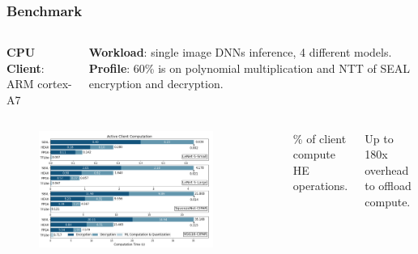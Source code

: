 \documentclass[10pt,handout]{beamer}
\begin{document}
\begin{frame}
\frametitle{Benchmark}
\begin{columns}
    \textbf{CPU Client}: ARM cortex-A7
    \vspace{0.1cm}

    \textbf{Workload}: single image DNNs inference, 4 different models.
\pause
    \textbf{Profile}: 60\% is on polynomial multiplication and NTT of SEAL encryption and decryption.
\end{columns}

\pause
\begin{columns}
\begin{figure}
    \includegraphics[width=0.85\textwidth]{motivation.png}
\end{figure}
    \vspace{-0.5cm}
\% of client compute HE operations.
    \vspace{0.3cm}

Up to 180x overhead to offload compute.
\end{columns}
\centering


\end{frame}


\end{document}
